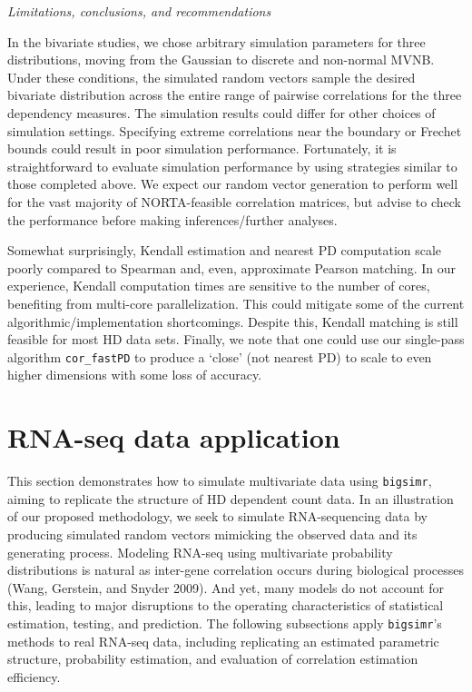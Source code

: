 \documentclass{article}
\begin{document}
\emph{Limitations, conclusions, and recommendations}

In the bivariate studies, we chose arbitrary simulation parameters for
three distributions, moving from the Gaussian to discrete and non-normal
MVNB. Under these conditions, the simulated random vectors sample the
desired bivariate distribution across the entire range of pairwise
correlations for the three dependency measures. The simulation results
could differ for other choices of simulation settings. Specifying
extreme correlations near the boundary or Frechet bounds could result in
poor simulation performance. Fortunately, it is straightforward to
evaluate simulation performance by using strategies similar to those
completed above. We expect our random vector generation to perform well
for the vast majority of NORTA-feasible correlation matrices, but advise
to check the performance before making inferences/further analyses.

Somewhat surprisingly, Kendall estimation and nearest PD computation
scale poorly compared to Spearman and, even, approximate Pearson
matching. In our experience, Kendall computation times are sensitive to
the number of cores, benefiting from multi-core parallelization. This
could mitigate some of the current algorithmic/implementation
shortcomings. Despite this, Kendall matching is still feasible for most
HD data sets. Finally, we note that one could use our single-pass
algorithm \texttt{cor\_fastPD} to produce a `close' (not nearest PD) to
scale to even higher dimensions with some loss of accuracy.

\hypertarget{examples}{%
\section{RNA-seq data application}\label{examples}}

This section demonstrates how to simulate multivariate data using
\texttt{bigsimr}, aiming to replicate the structure of HD dependent
count data. In an illustration of our proposed methodology, we seek to
simulate RNA-sequencing data by producing simulated random vectors
mimicking the observed data and its generating process. Modeling RNA-seq
using multivariate probability distributions is natural as inter-gene
correlation occurs during biological processes (Wang, Gerstein, and
Snyder 2009). And yet, many models do not account for this, leading to
major disruptions to the operating characteristics of statistical
estimation, testing, and prediction. The following subsections apply
\texttt{bigsimr}'s methods to real RNA-seq data, including replicating
an estimated parametric structure, probability estimation, and
evaluation of correlation estimation efficiency.
\end{document}
